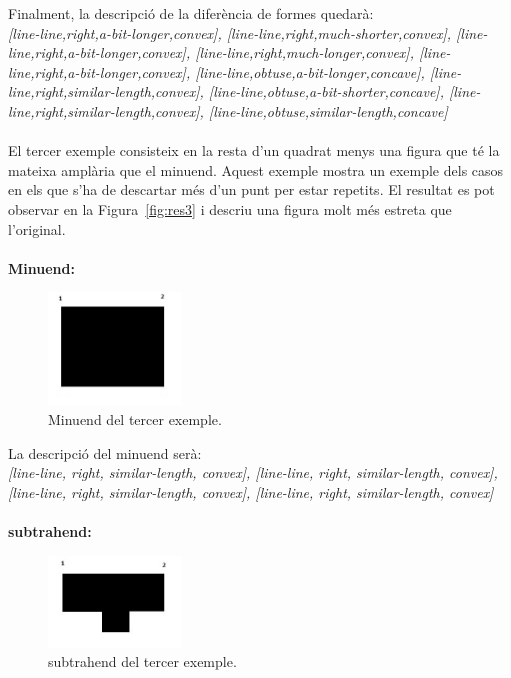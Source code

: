 \documentclass{article}
\begin{document}
Finalment, la descripció de la diferència de formes quedarà:
\\
\emph {[line-line,right,a-bit-longer,convex], [line-line,right,much-shorter,convex], [line-line,right,a-bit-longer,convex], [line-line,right,much-longer,convex], [line-line,right,a-bit-longer,convex], [line-line,obtuse,a-bit-longer,concave], [line-line,right,similar-length,convex], [line-line,obtuse,a-bit-shorter,concave], [line-line,right,similar-length,convex], [line-line,obtuse,similar-length,concave]}
\\
\\
El tercer exemple consisteix en la resta d'un quadrat menys una figura que té la mateixa amplària que el minuend.
Aquest exemple mostra un exemple dels casos en els que s'ha de descartar més d'un punt per estar repetits.
El resultat es pot observar en la Figura~\ref{fig:res3} i descriu una figura molt més estreta que l'original.
\\
\\
{\bf Minuend:}
\begin{figure}[!h]
\centering
\includegraphics[width=100pt]{images/quad_gran.jpg}
\caption {Minuend del tercer exemple.}
\label {fig:quad_gran3}
\end{figure}

La descripció del minuend serà:
\\
\emph {[line-line, right, similar-length, convex], [line-line, right, similar-length, convex], [line-line, right, similar-length, convex], [line-line, right, similar-length, convex]}
\\
\\

{\bf subtrahend:}
\begin{figure}[!h]
\centering
\includegraphics[width=100pt]{images/quad_punta.jpg}
\caption {subtrahend del tercer exemple.}
\label {fig:quad_punta}
\end{figure}
\end{document}
